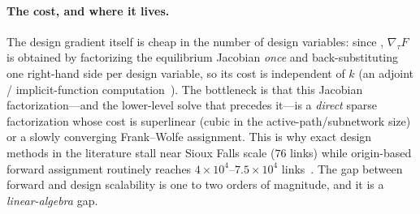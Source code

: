 \documentclass[ijoc]{informs3}
\begin{document}
\paragraph{The cost, and where it lives.}
The design gradient itself is cheap in the number of design variables: since \citet{tobinfriesz1988}, $\nabla_\tau F$ is obtained by factorizing the equilibrium Jacobian \emph{once}
and back-substituting one right-hand side per design variable, so its cost is independent of $k$ (an adjoint /
implicit-function computation~\citep{jp2007,amos2017,blondel2022}). The bottleneck is that this Jacobian
factorization---and the lower-level solve that precedes it---is a \emph{direct} sparse factorization whose cost
is superlinear (cubic in the active-path/subnetwork size) or a slowly converging Frank--Wolfe assignment. This
is why exact design methods in the literature stall near Sioux Falls scale ($76$ links) while origin-based
forward assignment routinely reaches $4\times10^4$--$7.5\times10^4$ links~\citep{bargera2002,dial2006}. The gap
between forward and design scalability is one to two orders of magnitude, and it is a \emph{linear-algebra} gap.
\end{document}
